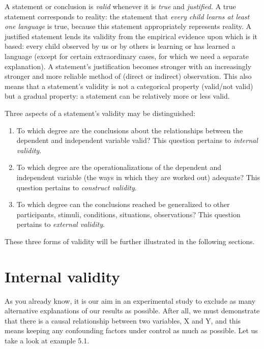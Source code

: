\documentclass[
]{book}
\begin{document}
A statement or conclusion is \emph{valid} whenever it is \emph{true} and \emph{justified.} A true statement corresponds to reality: the statement that \emph{every child learns at least one language} is true, because this statement appropriately represents reality. A justified statement lends its validity from the empirical evidence upon which is it based: every child observed by us or by others is learning or has learned a language (except for certain extraordinary cases, for which we need a separate explanation). A statement's justification becomes stronger with an increasingly stronger and more reliable method of (direct or indirect) observation. This also means that a statement's validity is not a categorical property (valid/not valid) but a gradual property: a statement can be relatively more or less valid.

Three aspects of a statement's validity may be distinguished:

\begin{enumerate}
\def\labelenumi{\arabic{enumi}.}
\item
  To which degree are the conclusions about the relationships between the dependent and independent variable valid? This question pertains to \emph{internal validity}.
\item
  To which degree are the operationalizations of the dependent and independent variable (the ways in which they are worked out) adequate? This question pertains to \emph{construct validity}.
\item
  To which degree can the conclusions reached be generalized to other participants, stimuli, conditions, situations, observations? This question pertains to \emph{external validity}.
\end{enumerate}

These three forms of validity will be further illustrated in the following sections.

\section{Internal validity}\label{sec:internalvalidity}

As you already know, it is our aim in an experimental study to exclude as many alternative explanations of our results as possible. After all, we must demonstrate that there is a causal relationship between two variables, X and Y, and this means keeping any confounding factors under control as much as possible. Let us take a look at example 5.1.
\end{document}
